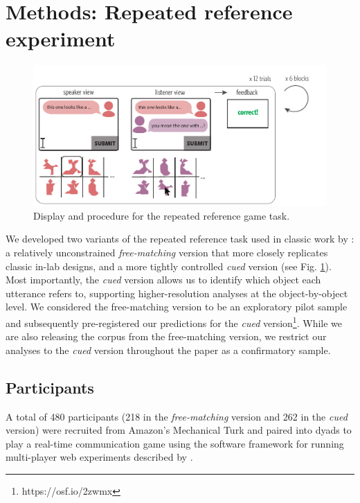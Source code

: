 \documentclass[alpha-refs]{wiley-article}
\begin{document}
\section{Methods: Repeated reference experiment}

\begin{figure}
\centering
\includegraphics[scale=.9]{designAndExample.pdf}
\caption{Display and procedure for the repeated reference game task.}
\label{fig:design}
\end{figure}

We developed two variants of the repeated reference task used in classic work by \cite{ClarkWilkesGibbs86_ReferringCollaborative}: a relatively unconstrained \emph{free-matching} version that more closely replicates classic in-lab designs, and a more tightly controlled \emph{cued} version (see Fig. \ref{fig:design}). 
Most importantly, the \emph{cued} version allows us to identify which object each utterance refers to, supporting higher-resolution analyses at the object-by-object level.
We considered the free-matching version to be an exploratory pilot sample and subsequently pre-registered our predictions for the \emph{cued} version\footnote{https://osf.io/2zwmx}.
While we are also releasing the corpus from the free-matching version, we restrict our analyses to the \emph{cued} version throughout the paper as a confirmatory sample.

\subsection{Participants}\label{participants}

A total of 480 participants (218 in the \emph{free-matching} version and 262 in the \emph{cued} version) were recruited from Amazon's Mechanical Turk and paired into dyads to play a real-time communication game using the software framework for running multi-player web experiments described by \cite{Hawkins15_RealTimeWebExperiments}. 
\end{document}

